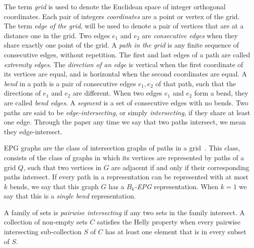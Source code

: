 \documentclass[9pt]{entcs}
\begin{document}
The term \emph{grid} is used to denote the Euclidean space of integer orthogonal coordinates. Each pair of integers \emph{coordinates} are a point or vertex of the grid. The term \emph{edge of the grid}, will be used to denote a pair of vertices that are at a distance one in the grid. Two edges $e_1$ and $e_2$ are \emph{consecutive edges} when they share exactly one point of the grid. %
 A \emph{path in the grid} is any finite sequence of consecutive edges, without  repetition. The first and last edges of a path are called \emph{extremity edges}.
The \emph{direction of an edge} is vertical when the first coordinate of its vertices  are equal, and is horizontal when the second coordinates are equal. A \emph {bend} in a path is a pair of consecutive edges $ e_1, e_2 $ of that path, such that the directions of $ e_1$ and $ e_2$ are different. When two edges $ e_1$ and $e_2 $ form a bend, they are called \emph { bend edges}. A \emph {segment} is a set of consecutive edges with no bends. %
 Two paths are said to be \emph{edge-intersecting}, or  simply  \emph{intersecting}, if they share at least one edge. %
 Through the paper any time we say that two paths intersect, we mean they edge-intersect.  %

EPG graphs are the class of intersection graphs of paths in a grid~\cite{golumbic2009}. This class,  consists of the class of graphs in which its vertices are represented by paths of a grid $ Q $, such that two vertices in $ G $ are adjacent if and only if their corresponding paths intersect. If every path in a representation can be represented with at most $ k $ bends, we say that this graph $ G $ has a \emph{ $ B_k$-EPG} representation.%
When $ k = 1 $ we say that this is a \emph{single bend} representation.


A family of sets is \emph{pairwise intersecting} if any two sets in the family intersect. A collection of non-empty sets $C$ satisfies the Helly property when every pairwise intersecting sub-collection $S$ of $ C $ has at least one element that is in every subset of $S$.
\end{document}
